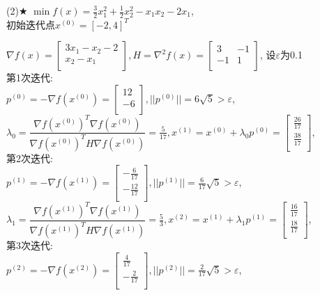 \begin{problem}{(2)$\bigstar$}
    $\min f(x)=\frac{3}{2}x_1^2+\frac{1}{2}x_2^2-x_1x_2-2x_1$,\\
    初始迭代点${x^{(0)}}=[-2,4]^T$
\end{problem}
\begin{solution}
    $\nabla f(x)=\begin{bmatrix}
        3x_1-x_2-2  \\
        x_2-x_1  \\
    \end{bmatrix}, H=\nabla^2 f(x)=\begin{bmatrix}
        3   & -1  \\
        -1  & 1  \\
    \end{bmatrix}$,
    设$\varepsilon$为0.1\\
    第1次迭代:\\
    $p^{(0)}=-\nabla f(x^{(0)})=\begin{bmatrix} 12\\-6\\\end{bmatrix},||p^{(0)}||=6\sqrt{5}>\varepsilon$,\\
    $\lambda_0=\dfrac{\nabla f(x^{(0)})^T\nabla f(x^{(0)})}{\nabla f(x^{(0)})^TH\nabla f(x^{(0)})}=\frac{5}{17},x^{(1)}=x^{(0)}+\lambda_0p^{(0)}=\begin{bmatrix} \frac{26}{17}\\\frac{38}{17}\\\end{bmatrix}$,\\
    第2次迭代:\\
    $p^{(1)}=-\nabla f(x^{(1)})=\begin{bmatrix} -\frac{6}{17}\\-\frac{12}{17}\\\end{bmatrix},||p^{(1)}||=\frac{6}{17}\sqrt{5}>\varepsilon$,\\
    $\lambda_1=\dfrac{\nabla f(x^{(1)})^T\nabla f(x^{(1)})}{\nabla f(x^{(1)})^TH\nabla f(x^{(1)})}=\frac{5}{3},x^{(2)}=x^{(1)}+\lambda_1p^{(1)}=\begin{bmatrix} \frac{16}{17}\\\frac{18}{17}\\\end{bmatrix}$,\\
    第3次迭代:\\
    $p^{(2)}=-\nabla f(x^{(2)})=\begin{bmatrix} \frac{4}{17}\\-\frac{2}{17}\\\end{bmatrix},||p^{(2)}||=\frac{2}{17}\sqrt{5}>\varepsilon$,\\

\end{solution}
